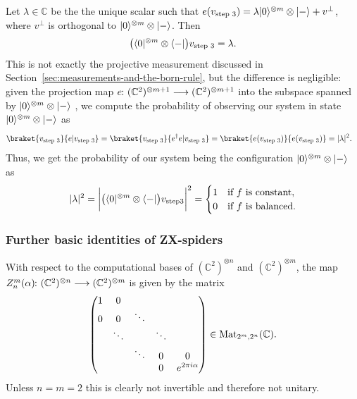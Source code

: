 \documentclass[a4paper, oneside, 12pt]{amsart}
\begin{document}
Let \(\lambda\in \mathbb{C}\) be the the unique scalar such that \(e(v_{\text{step 3}})= \lambda \lvert0\rangle^{\otimes m} \otimes \lvert-\rangle + v^{\perp}\), where \(v^{\perp}\) is orthogonal to \(\lvert0\rangle^{\otimes m} \otimes \lvert-\rangle\).
Then
\begin{equation*}
  \big(\langle0\rvert^{\otimes m} \otimes \langle-\rvert \big)v_{\text{step 3}} = \lambda.
\end{equation*}
This is not exactly the projective measurement discussed in Section~\ref{sec:measurements-and-the-born-rule}, but the difference is negligible:
given the projection map  \( e \from (\mathbb{C}^2)^{\otimes m+1} \to (\mathbb{C}^{2})^{\otimes m+1} \) into the subspace spanned by \( \lvert0\rangle^{\otimes m} \otimes \lvert-\rangle \) , we compute the probability of observing our system in state \(\lvert0\rangle^{\otimes m}\otimes \lvert-\rangle\) as
\begin{align*}
  \braket{v_{\text{step 3}}}{ e | v_{\text{step 3}}}
  & = \braket{v_{\text{step 3}}}{ e^{\dagger} e | v_{\text{step 3}}}
    = \braket{e(v_{\text{step 3}})}{e(v_{\text{step 3}})}
    = |\lambda|^{2}.
\end{align*}
Thus, we get the probability of our system being the configuration \(\lvert0\rangle^{\otimes m}\otimes \lvert-\rangle\) as
\begin{equation*}
  |\lambda|^{2}
  = \bigg| \big(\langle0\rvert^{\otimes m} \otimes \langle-\rvert \big)v_{\mathrm{step 3}} \bigg|^{2}
  =
  \begin{cases}
    1 & \text{if } f \text{ is constant}, \\
    0 & \text{if } f \text{ is balanced}.
  \end{cases}
\end{equation*}

\subsubsection{Further basic identities of ZX-spiders}\label{sec:further-basic-identities-of-zx-spiders}
With respect to the computational bases of \( (\mathbb{C}^{2})^{\otimes n} \) and \( (\mathbb{C}^{2})^{\otimes m}\), the map \(Z_n^m(\alpha) \from (\mathbb{C}^{2})^{\otimes n} \to ( \mathbb{C}^{2})^{\otimes m}\) is given by the matrix
\begin{equation}\label{eq:Z-spider-as-matrix}
  \begin{pmatrix}
    1 & 0 &   &   &\\
    0 & 0 & \ddots &   &\\
      & \ddots &   & \ddots &\\
      &   & \ddots & 0 & 0 \\
      &   &   & 0 &  e^{2\pi i \alpha}
  \end{pmatrix} \in \operatorname{Mat}_{2^{m}, 2^{n}}( \mathbb{C}).
\end{equation}
Unless \(n=m=2\) this is clearly not invertible and therefore not unitary.
\end{document}
